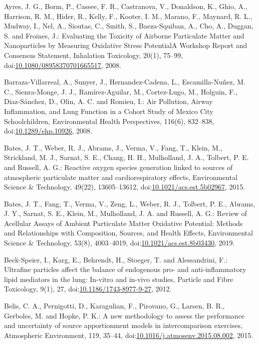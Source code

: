 \documentclass[
]{article}
\begin{document}
Ayres, J. G., Borm, P., Cassee, F. R., Castranova, V., Donaldson, K.,
Ghio, A., Harrison, R. M., Hider, R., Kelly, F., Kooter, I. M., Marano,
F., Maynard, R. L., Mudway, I., Nel, A., Sioutas, C., Smith, S.,
Baeza-Squiban, A., Cho, A., Duggan, S. and Froines, J.: Evaluating the
Toxicity of Airborne Particulate Matter and Nanoparticles by Measuring
Oxidative Stress PotentialA Workshop Report and Consensus Statement,
Inhalation Toxicology, 20(1), 75--99,
doi:\href{https://doi.org/10.1080/08958370701665517}{10.1080/08958370701665517},
2008.

Barraza-Villarreal, A., Sunyer, J., Hernandez-Cadena, L.,
Escamilla-Nuñez, M. C., Sienra-Monge, J. J., Ramírez-Aguilar, M.,
Cortez-Lugo, M., Holguin, F., Diaz-Sánchez, D., Olin, A. C. and Romieu,
I.: Air Pollution, Airway Inflammation, and Lung Function in a Cohort
Study of Mexico City Schoolchildren, Environmental Health Perspectives,
116(6), 832--838,
doi:\href{https://doi.org/10.1289/ehp.10926}{10.1289/ehp.10926}, 2008.

Bates, J. T., Weber, R. J., Abrams, J., Verma, V., Fang, T., Klein, M.,
Strickland, M. J., Sarnat, S. E., Chang, H. H., Mulholland, J. A.,
Tolbert, P. E. and Russell, A. G.: Reactive oxygen species generation
linked to sources of atmospheric particulate matter and
cardiorespiratory effects, Environmental Science \& Technology, 49(22),
13605--13612,
doi:\href{https://doi.org/10.1021/acs.est.5b02967}{10.1021/acs.est.5b02967},
2015.

Bates, J. T., Fang, T., Verma, V., Zeng, L., Weber, R. J., Tolbert, P.
E., Abrams, J. Y., Sarnat, S. E., Klein, M., Mulholland, J. A. and
Russell, A. G.: Review of Acellular Assays of Ambient Particulate Matter
Oxidative Potential: Methods and Relationships with Composition,
Sources, and Health Effects, Environmental Science \& Technology, 53(8),
4003--4019,
doi:\href{https://doi.org/10.1021/acs.est.8b03430}{10.1021/acs.est.8b03430},
2019.

Beck-Speier, I., Karg, E., Behrendt, H., Stoeger, T. and Alessandrini,
F.: Ultrafine particles affect the balance of endogenous pro- and
anti-inflammatory lipid mediators in the lung: In-vitro and in-vivo
studies, Particle and Fibre Toxicology, 9(1), 27,
doi:\href{https://doi.org/10.1186/1743-8977-9-27}{10.1186/1743-8977-9-27},
2012.

Belis, C. A., Pernigotti, D., Karagulian, F., Pirovano, G., Larsen, B.
R., Gerboles, M. and Hopke, P. K.: A new methodology to assess the
performance and uncertainty of source apportionment models in
intercomparison exercises, Atmospheric Environment, 119, 35--44,
doi:\href{https://doi.org/10.1016/j.atmosenv.2015.08.002}{10.1016/j.atmosenv.2015.08.002},
2015.
\end{document}
